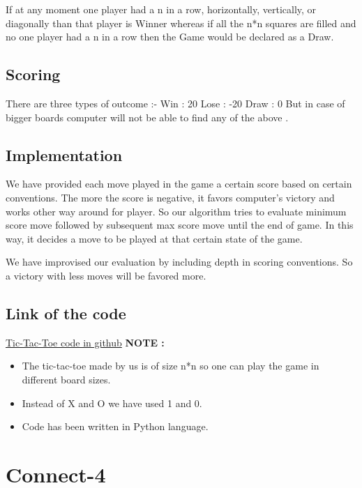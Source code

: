 \documentclass[11pt]{article}
\begin{document}
If at any moment one player had a n in a row, horizontally, vertically, or diagonally than that player is Winner whereas if all the n*n squares are filled and no one player had a n in a row then the Game would be declared as a Draw.

\subsection{Scoring}
There are three types of outcome :-\linebreak
Win     :  20\linebreak
Lose    :  -20\linebreak
Draw  :  0\linebreak
But in case of bigger boards computer will not be able to find any of the above . 
\subsection{Implementation}
We have provided each move played in the game a certain score based on certain conventions. The more the score is negative, it favors computer’s victory and works other way around for player. So our algorithm tries to evaluate minimum score move followed by subsequent max score move until the end of game. In this way, it decides a move to be played at that certain state of the game.

We have improvised our evaluation by including depth in scoring conventions. So a victory with less moves will be favored more.
\subsection{Link of the code}
\href{https://github.com/tharwani/HELLO-WORLD/blob/master/ttt1.py}{\color{blue}Tic-Tac-Toe code in github}\linebreak \linebreak
\textbf{NOTE :}
\begin{itemize}
    \item The tic-tac-toe made by us is of size n*n so one can play the game in different board sizes.
\item Instead of X and O we have used 1 and 0.
\item Code has been written in Python language.
\end{itemize}

\pagebreak
\section{Connect-4}
\end{document}
